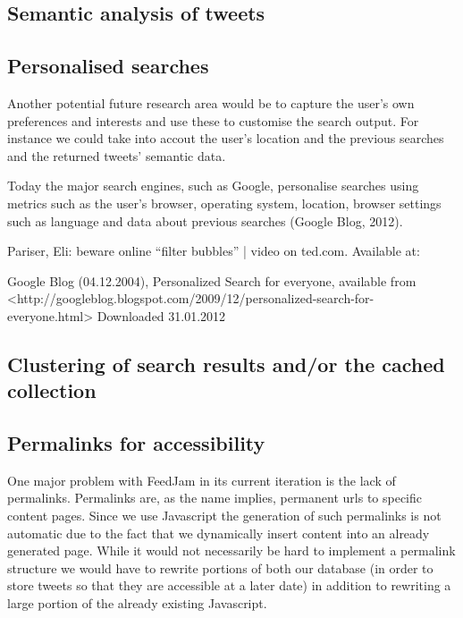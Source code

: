 \subsection{Semantic analysis of tweets} %

\subsection{Personalised searches} %
Another potential future research area would be to capture the user's own preferences and interests and use these to customise the search output. For instance we could take into accout the user's location and the previous searches and the returned tweets' semantic data.

Today the major search engines, such as Google, personalise searches using metrics such as the user's browser, operating system, location, browser settings such as language and data about previous searches (Google Blog, 2012).

Pariser, Eli: beware online “filter bubbles” | video on ted.com. Available at: %

Google Blog (04.12.2004), Personalized Search for everyone, available from <http://googleblog.blogspot.com/2009/12/personalized-search-for-everyone.html> Downloaded 31.01.2012

\subsection{Clustering of search results and/or the cached collection} %

\subsection{Permalinks for accessibility}
One major problem with FeedJam in its current iteration is the lack of permalinks. Permalinks are, as the name implies, permanent urls to specific content pages. Since we use Javascript the generation of such permalinks is not automatic due to the fact that we dynamically insert content into an already generated page. While it would not necessarily be hard to implement a permalink structure we would have to rewrite portions of both our database (in order to store tweets so that they are accessible at a later date) in addition to rewriting a large portion of the already existing Javascript.